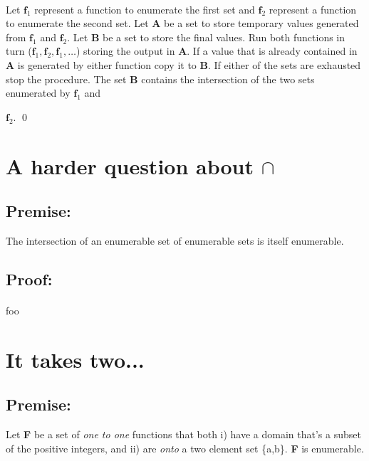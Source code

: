 \documentclass[a4paper,11pt]{article}
\begin{document}
		\paragraph{}
		Let $\textbf{f}_{1}$ represent a function to enumerate the first set and $\textbf{f}_{2}$ represent
		a function to enumerate the second set. Let \textbf{A} be a set to store temporary values generated 			from $\textbf{f}_{1}$ and $\textbf{f}_{2}$. Let \textbf{B} be a set to store the final values. Run both 			functions in turn ($\textbf{f}_{1},\textbf{f}_{2},\textbf{f}_{1},\dots$) storing the output in \textbf{A}. 
		If a value that is already contained in \textbf{A} is generated by either function copy it to \textbf{B}.
		If either of the sets are exhausted stop the procedure. The set \textbf{B} contains the 
		intersection of the two sets enumerated by $\textbf{f}_{1}$ and {$\textbf{f}_{2}$. \qed
		


\section{A harder question about $\cap$}

	\subsection*{Premise:}
	The intersection of an enumerable set of enumerable sets is itself enumerable.

	\subsection*{Proof:}
		\paragraph{}
		foo


\section{It takes two...}

	\subsection*{Premise:}
	Let \textbf{F} be a set of \textit{one to one} functions that both i) have a domain that's a subset of the positive
	integers, and ii) are \textit{onto} a two element set \{a,b\}. \textbf{F} is enumerable.

}
\end{document}
